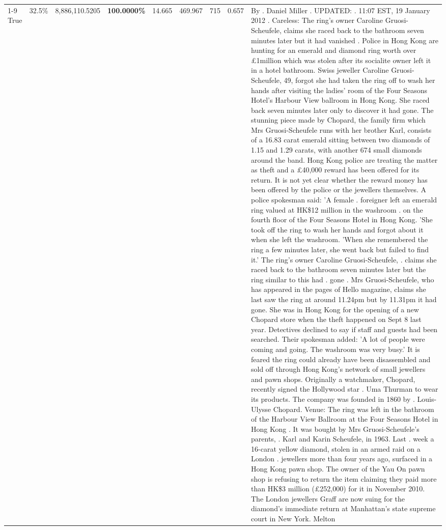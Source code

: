 \begin{table}[H]
\begin{tabular}{lllrlllll}
\cline{1-9}
True & 32.5\% & 8,886,110.5205 & \bfseries \color{red} 100.0000\% & 14.665 & 469.967 & 715 & 0.657 & By . Daniel Miller . UPDATED: . 11:07 EST, 19 January 2012 . Careless: The ring's owner Caroline Gruosi-Scheufele, claims she raced back to the bathroom seven minutes later but it had vanished . Police in Hong Kong are hunting for an emerald and diamond ring worth over £1million which was stolen after its socialite owner left it in a hotel bathroom. Swiss jeweller Caroline Gruosi-Scheufele, 49, forgot she had taken the ring off to wash her hands after visiting the ladies' room of the Four Seasons Hotel's Harbour View ballroom in Hong Kong. She raced back seven minutes later only to discover it had gone. The stunning piece made by Chopard, the family firm which Mrs Gruosi-Scheufele runs with her brother Karl, consists of a 16.83 carat emerald sitting between two diamonds of 1.15 and 1.29 carats, with another 674 small diamonds around the band. Hong Kong police are treating the matter as theft and a £40,000 reward has been offered for its return. It is not yet clear whether the reward money has been offered by the police or the jewellers themselves. A police spokesman said: 'A female . foreigner left an emerald ring valued at HK\$12 million in the washroom . on the fourth floor of the Four Seasons Hotel in Hong Kong. 'She took off the ring to wash her hands and forgot about it when she left the washroom. 'When she remembered the ring a few minutes later, she went back but failed to find it.' The ring's owner Caroline Gruosi-Scheufele, . claims she raced back to the bathroom seven minutes later but the ring similar to this had . gone . Mrs Gruosi-Scheufele, who has appeared in the pages of Hello magazine, claims she last saw the ring at around 11.24pm but by 11.31pm it had gone. She was in Hong Kong for the opening of a new Chopard store when the theft happened on Sept 8 last year. Detectives declined to say if staff and guests had been searched. Their spokesman added: 'A lot of people were coming and going. The washroom was very busy.' It is feared the ring could already have been disassembled and sold off through Hong Kong's network of small jewellers and pawn shops. Originally a watchmaker, Chopard, recently signed the Hollywood star . Uma Thurman to wear its products. The company was founded in 1860 by . Louis-Ulysse Chopard. Venue: The ring was left in the bathroom of the Harbour View Ballroom at the Four Seasons Hotel in Hong Kong . It was bought by Mrs Gruosi-Scheufele's  parents, . Karl and Karin Scheufele, in 1963. Last . week a 16-carat yellow diamond, stolen in an armed raid on a London . jewellers more than four years ago, surfaced in a Hong Kong pawn shop. The owner of the Yau On pawn shop is refusing to return the item claiming they paid more than HK\$3 million (£252,000) for it in November 2010. The London jewellers Graff are now suing for the diamond’s immediate return at Manhattan’s state supreme court in New York. Melton \\

\end{tabular}
\end{table}
